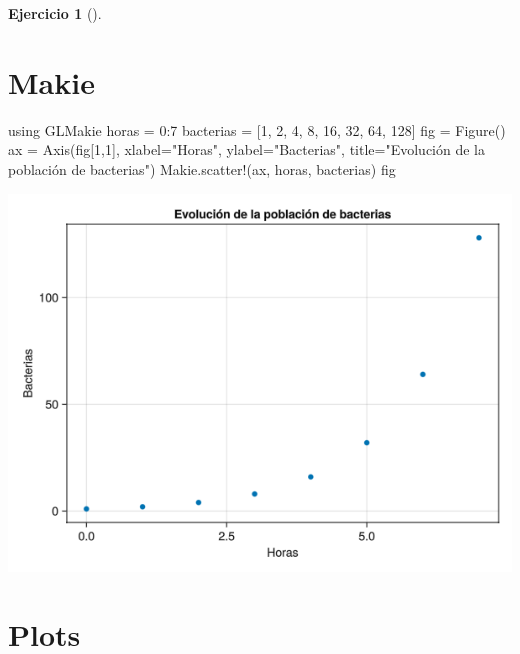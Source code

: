 \documentclass[
  a4paper,
]{scrreport}
\newenvironment{Shaded}{\begin{snugshade}}{\end{snugshade}}
\newcommand{\BuiltInTok}[1]{\textcolor[rgb]{0.00,0.23,0.31}{#1}}
\newcommand{\FloatTok}[1]{\textcolor[rgb]{0.68,0.00,0.00}{#1}}
\newcommand{\FunctionTok}[1]{\textcolor[rgb]{0.28,0.35,0.67}{#1}}
\newcommand{\ImportTok}[1]{\textcolor[rgb]{0.00,0.46,0.62}{#1}}
\newcommand{\NormalTok}[1]{\textcolor[rgb]{0.00,0.23,0.31}{#1}}
\newcommand{\OperatorTok}[1]{\textcolor[rgb]{0.37,0.37,0.37}{#1}}
\newcommand{\StringTok}[1]{\textcolor[rgb]{0.13,0.47,0.30}{#1}}
\theoremstyle{definition}
\newtheorem{exercise}{Ejercicio}[chapter]
\theoremstyle{remark}
\begin{document}
\begin{exercise}[]
\begin{enumerate}
\begin{tcolorbox}
  \section{Makie}

\begin{Shaded}
\begin{Highlighting}[]
\ImportTok{using} \BuiltInTok{GLMakie}
\NormalTok{horas }\OperatorTok{=} \FloatTok{0}\OperatorTok{:}\FloatTok{7}
\NormalTok{bacterias }\OperatorTok{=}\NormalTok{ [}\FloatTok{1}\NormalTok{, }\FloatTok{2}\NormalTok{, }\FloatTok{4}\NormalTok{, }\FloatTok{8}\NormalTok{, }\FloatTok{16}\NormalTok{, }\FloatTok{32}\NormalTok{, }\FloatTok{64}\NormalTok{, }\FloatTok{128}\NormalTok{]}
\NormalTok{fig }\OperatorTok{=} \FunctionTok{Figure}\NormalTok{()}
\NormalTok{ax }\OperatorTok{=} \FunctionTok{Axis}\NormalTok{(fig[}\FloatTok{1}\NormalTok{,}\FloatTok{1}\NormalTok{], xlabel}\OperatorTok{=}\StringTok{"Horas"}\NormalTok{, ylabel}\OperatorTok{=}\StringTok{"Bacterias"}\NormalTok{, title}\OperatorTok{=}\StringTok{"Evolución de la población de bacterias"}\NormalTok{)}
\NormalTok{Makie.}\FunctionTok{scatter!}\NormalTok{(ax, horas, bacterias)}
\NormalTok{fig}
\end{Highlighting}
\end{Shaded}

  \includegraphics{03-funciones-elementales_files/figure-pdf/cell-3-output-1.png}

  \section{Plots}


\end{tcolorbox}
\end{enumerate}
\end{exercise}
\end{document}
